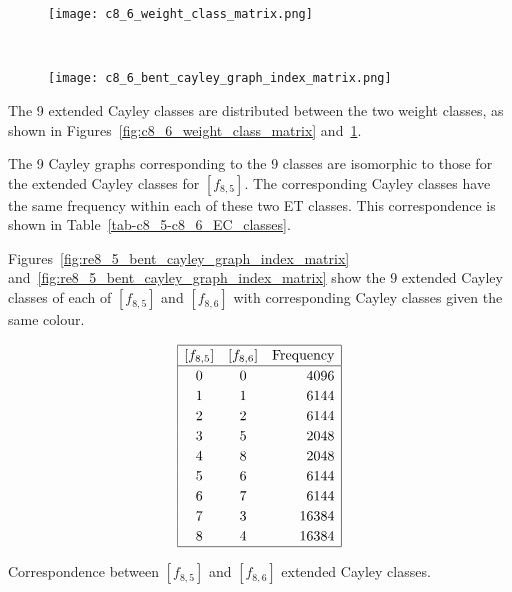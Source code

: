 \begin{figure}[!hb] %
\centering
\begin{minipage}{.48\textwidth}
  \centering
  \texttt{[image: c8\_6\_weight\_class\_matrix.png]}
  \label{fig:c8_6_weight_class_matrix}
\end{minipage}%
~~~~
\begin{minipage}{.48\textwidth}
  \centering
  \texttt{[image: c8\_6\_bent\_cayley\_graph\_index\_matrix.png]}
  \label{fig:c8_6_bent_cayley_graph_index_matrix}
\end{minipage}
\end{figure}

The 9 extended Cayley classes are distributed between the two weight classes,
as shown in Figures~\ref{fig:c8_6_weight_class_matrix} and~\ref{fig:c8_6_bent_cayley_graph_index_matrix}.

The 9 Cayley graphs corresponding to the 9 classes are isomorphic to those for the extended Cayley classes for $[f_{8,5}]$.
The corresponding Cayley classes have the same frequency within each of these two ET classes.
This correspondence is shown in Table~\ref{tab-c8_5-c8_6_EC_classes}.

Figures~\ref{fig:re8_5_bent_cayley_graph_index_matrix} and~\ref{fig:re8_5_bent_cayley_graph_index_matrix}
show the 9 extended Cayley classes of each of $[f_{8,5}]$ and $[f_{8,6}]$ with corresponding Cayley classes
given the same colour.

\begin{table}[!bhpt] %
%
\small{}
\begin{align*}
\def\arraystretch{1.2}
\begin{array}{|ccr|}
\hline
[f_{8,5}] &
[f_{8,6}] &
\text{Frequency}
\\
\hline
  0 &    0 &  4096
\\
  1 &    1 &  6144
\\
  2 &    2 &  6144
\\
  3 &    5 &  2048
\\
  4 &    8 &  2048
\\
  5 &    6 &  6144
\\
  6 &    7 &  6144
\\
  7 &    3 & 16384
\\
  8 &    4 & 16384
\\
\hline
\end{array}
\end{align*}
\caption{Correspondence between $[f_{8,5}]$ and $[f_{8,6}]$ extended Cayley classes.}
\label{tab-c8_5-c8_6_EC_classes}
\end{table}

